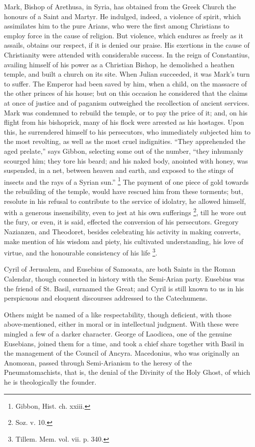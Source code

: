 Mark, Bishop of Arethusa, in Syria, has obtained from the Greek
Church the honours of a Saint and Martyr. He indulged, indeed, a
violence of spirit, which assimilates him to the pure Arians, who were
the first among Christians to employ force in the cause of religion.
But violence, which endures as freely as it assails, obtains our
respect, if it is denied our praise. His exertions in the cause of
Christianity were attended with considerable success. In the reign of
Constantius, availing himself of his power as a Christian Bishop, he
demolished a heathen temple, and built a church on its site. When
Julian succeeded, it was Mark's turn to suffer. The Emperor had been
saved by him, when a child, on the massacre of the other princes of
his house; but on this occasion he considered that the claims at once
of justice and of paganism outweighed the recollection of ancient
services. Mark was condemned to rebuild the temple, or to pay
the price of it; and, on his flight from his bishoprick, many of his
flock were arrested as his hostages. Upon this, he surrendered himself
to his persecutors, who immediately subjected him to the most
revolting, as well as the most cruel indignities. ``They
apprehended the aged prelate,'' says Gibbon, selecting some out of
the number, ``they inhumanly scourged him; they tore his beard;
and his naked body, anointed with honey, was suspended, in a net,
between heaven and earth, and exposed to the stings of insects and the
rays of a Syrian sun.'' \footnote{Gibbon, Hist. ch. xxiii.}
The payment of one piece of gold towards the rebuilding of the temple,
would have rescued him from these torments; but, resolute in his
refusal to contribute to the service of idolatry, he allowed himself,
with a generous insensibility, even to jest at his own sufferings \footnote{Soz. v. 10.}, till he wore out the fury, or even, it is said, effected the
conversion of his persecutors. Gregory Nazianzen, and Theodoret,
besides celebrating his activity in making converts, make mention of
his wisdom and piety, his cultivated understanding, his love of
virtue, and the honourable consistency of his life \footnote{Tillem. Mem. vol. vii. p. 340.}.

Cyril of Jerusalem, and Eusebius of Samosata, are both Saints in
the Roman Calendar, though connected in history with the Semi-Arian
party. Eusebius was the friend of St. Basil, surnamed the Great; and
Cyril is still known to us in his perspicuous and eloquent discourses
addressed to the Catechumens.

Others might be named of a like respectability, though deficient,
with those above-mentioned, either in moral or in intellectual
judgment. With these were mingled a few of a darker character. George
of Laodicea, one of the genuine Eusebians, joined them for a time, and
took a chief share together with Basil in the management of the
Council of Ancyra. Macedonius, who was originally an Anomœan, passed
through Semi-Arianism to the heresy of the Pneumatomachists, that is,
the denial of the Divinity of the Holy Ghost, of which he is
theologically the founder.


